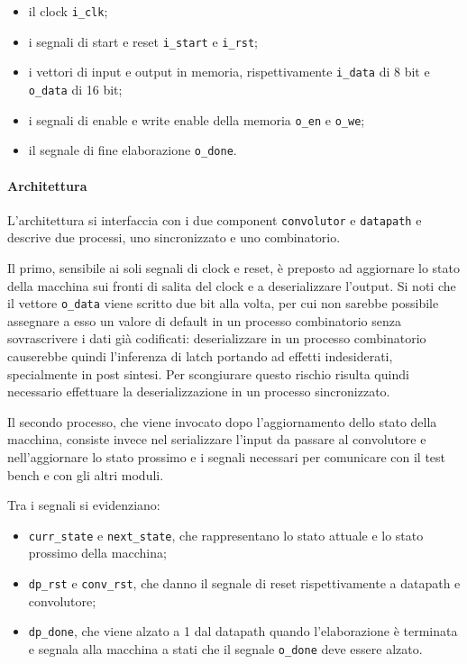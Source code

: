 \documentclass{article}
\begin{document}
			\begin{itemize}
				\item il clock \verb|i_clk|;
				\item i segnali di start e reset \verb|i_start| e \verb|i_rst|;
				\item i vettori di input e output in memoria, rispettivamente \verb|i_data| di 8
					bit e \verb|o_data| di 16 bit;
				\item i segnali di enable e write enable della memoria \verb|o_en| e \verb|o_we|;
				\item il segnale di fine elaborazione \verb|o_done|.
			\end{itemize}

			\paragraph{Architettura}
			L'architettura si interfaccia con i due component \verb|convolutor| e
			\verb|datapath| e descrive due processi, uno sincronizzato e uno combinatorio.

			Il primo, sensibile ai soli segnali di clock e reset, è preposto ad aggiornare lo
			stato della macchina sui fronti di salita del clock e a deserializzare l'output.
			Si noti che il vettore \verb|o_data| viene scritto due bit alla volta, per cui non
			sarebbe possibile assegnare a esso un valore di default in un processo combinatorio
			senza sovrascrivere i dati già codificati: deserializzare in un processo
			combinatorio causerebbe quindi l'inferenza di latch portando ad effetti
			indesiderati, specialmente in post sintesi. Per scongiurare questo rischio risulta
			quindi necessario effettuare la deserializzazione in un processo sincronizzato.

			Il secondo processo, che viene invocato dopo l'aggiornamento dello stato della
			macchina, consiste invece nel serializzare l'input da passare al convolutore e
			nell'aggiornare lo stato prossimo e i segnali necessari per comunicare con il test
			bench e con gli altri moduli.

			Tra i segnali si evidenziano:

			\begin{itemize}
				\item \verb|curr_state| e \verb|next_state|, che rappresentano lo stato attuale e
					lo stato prossimo della macchina;
				\item \verb|dp_rst| e \verb|conv_rst|, che danno il segnale di reset
					rispettivamente a datapath e convolutore;
				\item \verb|dp_done|, che viene alzato a 1 dal datapath quando l'elaborazione è
					terminata e segnala alla macchina a stati che il segnale \verb|o_done| deve
					essere alzato.
			\end{itemize}
\end{document}
